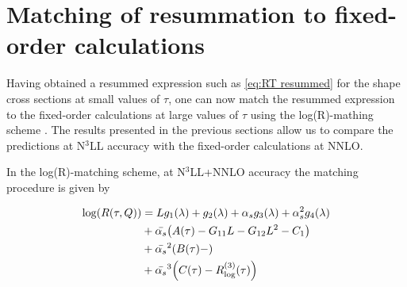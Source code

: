 \documentclass[../main.tex]{subfiles}
\begin{document}
\section{Matching of resummation to fixed-order calculations}\label{sec:Matching}

Having obtained a resummed expression such as \cref{eq:RT resummed} for the shape cross sections at small values
of $\tau$, one can now match the resummed expression to the fixed-order calculations at large values of $\tau$
using the log(R)-mathing scheme \cite{CATANI19933}. The results presented in the previous sections allow us to 
compare the predictions at N$^3$LL accuracy with the fixed-order calculations at NNLO.

In the log(R)-matching scheme, at N$^3$LL+NNLO accuracy the matching procedure is given by

\begin{equation}\label{eq:matching}
    \begin{split}
        \log(R(\tau,Q)) &= L g_1(\lambda)+ g_2(\lambda)+ \alpha_s g_3(\lambda)+\alpha_s^2 g_4(\lambda)\\
        &+ \bar{\alpha_s} \qty( A(\tau) - G_{11}L- G_{12}L^2 - C_1) \\
        &+ \bar{\alpha_s}^2 \qty( B(\tau)-  ) \\
        &+ \bar{\alpha_s}^3 \qty( C(\tau)- R_{\text{log}}^{(3)}(\tau) )
    \end{split}
\end{equation}
\end{document}

